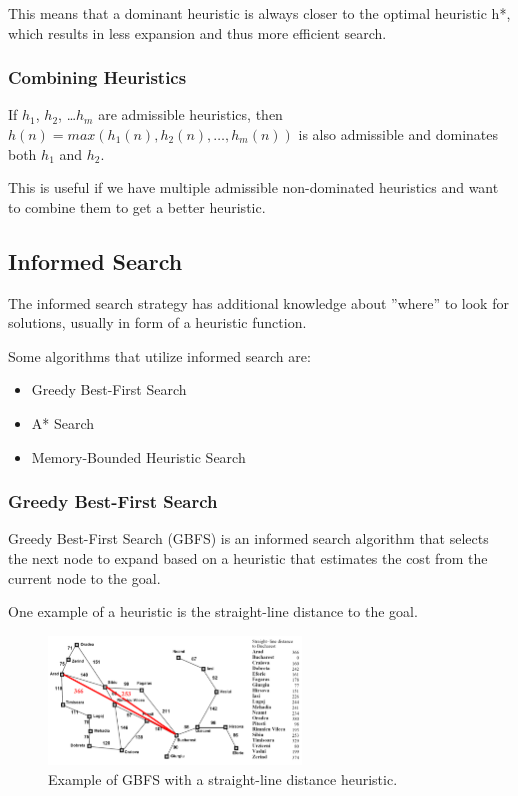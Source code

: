\documentclass[
../../EiKI_Summary.tex,
]
{subfiles}
\begin{document}
This means that a dominant heuristic is always closer to the optimal heuristic h*, which results in less expansion and thus more efficient search.

\subsubsection{Combining Heuristics}
\begin{defbox*}
    If $h_1$, $h_2$, \dots $h_m$ are admissible heuristics, then $h(n) = max(h_1(n), h_2(n),\dots,  h_m(n))$ is also admissible and dominates both $h_1$ and $h_2$.
\end{defbox*}

This is useful if we have multiple admissible non-dominated heuristics and want to combine them to get a better heuristic. 

\subsection{Informed Search}
\begin{defbox}
    [Definition]
    The informed search strategy has additional knowledge about ''where'' to look for solutions, usually in form of a heuristic function.

    Some algorithms that utilize informed search are:
    \begin{itemize}
        \item Greedy Best-First Search
        \item A* Search
        \item Memory-Bounded Heuristic Search
    \end{itemize}
\end{defbox}


\subsubsection{Greedy Best-First Search}
Greedy Best-First Search (GBFS) is an informed search algorithm that selects the next node to expand based on a heuristic that estimates the cost from the current node to the goal. 

One example of a heuristic is the straight-line distance to the goal. 

\begin{figure}[h!]
    \centering
    \includegraphics[width=0.6\textwidth]{Pics/03/GreedyBestFirstExample.png}
    \caption{Example of GBFS with a straight-line distance heuristic.}
\end{figure}
\end{document}
